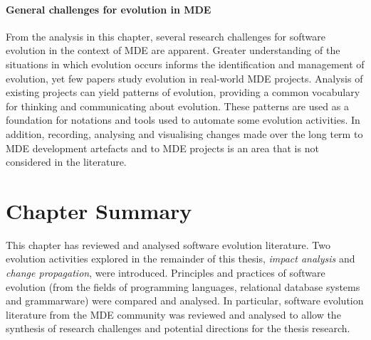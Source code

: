 \paragraph{General challenges for evolution in MDE} From the analysis in this chapter, several research challenges for software evolution in the context of MDE are apparent. Greater understanding of the situations in which evolution occurs informs the identification and management of evolution, yet few papers study evolution in real-world MDE projects. Analysis of existing projects can yield patterns of evolution, providing a common vocabulary for thinking and communicating about evolution. These patterns are used as a foundation  for notations and tools used to automate some evolution activities. In addition, recording, analysing and visualising changes made over the long term to MDE development artefacts and to MDE projects is an area that is not considered in the literature.

\section{Chapter Summary}
\label{sec:literature_review_summary}
This chapter has reviewed and analysed software evolution literature. Two evolution activities explored in the remainder of this thesis, \emph{impact analysis} and \emph{change propagation}, were introduced. Principles and practices of software evolution (from the fields of programming languages, relational database systems and grammarware) were compared and analysed. In particular, software evolution literature from the MDE community was reviewed and analysed to allow the synthesis of research challenges and potential directions for the thesis research.

